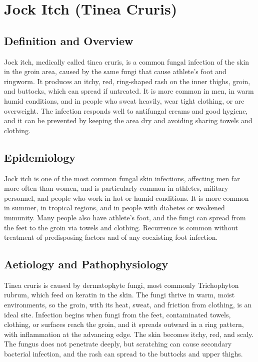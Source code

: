 \chapter{Jock Itch (Tinea Cruris)}

\section*{Definition and Overview}
Jock itch, medically called tinea cruris, is a common fungal infection of the skin in the groin area, caused by the same fungi that cause athlete's foot and ringworm. It produces an itchy, red, ring-shaped rash on the inner thighs, groin, and buttocks, which can spread if untreated. It is more common in men, in warm humid conditions, and in people who sweat heavily, wear tight clothing, or are overweight. The infection responds well to antifungal creams and good hygiene, and it can be prevented by keeping the area dry and avoiding sharing towels and clothing.

\section*{Epidemiology}
Jock itch is one of the most common fungal skin infections, affecting men far more often than women, and is particularly common in athletes, military personnel, and people who work in hot or humid conditions. It is more common in summer, in tropical regions, and in people with diabetes or weakened immunity. Many people also have athlete's foot, and the fungi can spread from the feet to the groin via towels and clothing. Recurrence is common without treatment of predisposing factors and of any coexisting foot infection.

\section*{Aetiology and Pathophysiology}
Tinea cruris is caused by dermatophyte fungi, most commonly Trichophyton rubrum, which feed on keratin in the skin. The fungi thrive in warm, moist environments, so the groin, with its heat, sweat, and friction from clothing, is an ideal site. Infection begins when fungi from the feet, contaminated towels, clothing, or surfaces reach the groin, and it spreads outward in a ring pattern, with inflammation at the advancing edge. The skin becomes itchy, red, and scaly. The fungus does not penetrate deeply, but scratching can cause secondary bacterial infection, and the rash can spread to the buttocks and upper thighs.

